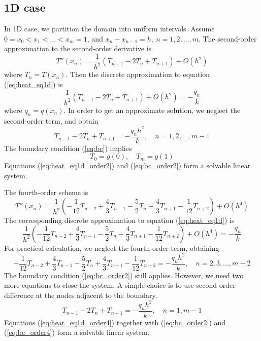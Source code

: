 \documentclass{article}
\begin{document}
\subsection{1D case}
In 1D case, we partition the domain into uniform intervals. Assume $0 = x_0 < x_1 < ... < x_m = 1$, and $x_n - x_{n-1} = h,\  n = 1, 2, ..., m$.
The second-order approximation to the second-order derivative is
    $$T''(x_n) = \frac{1}{h^2}\left(T_{n-1} - 2 T_n + T_{n+1}\right) + O(h^2)$$
where $T_n = T(x_n)$.
Then the discrete approximation to equation (\ref{eq:heat_eq1d}) is
    $$\frac{1}{h^2}\left(T_{n-1} - 2 T_n + T_{n+1}\right) + O(h^2) = -\frac{q_n}{k}$$
where $q_n = q(x_n)$. In order to get an approximate solution, we neglect the second-order term, and obtain
\begin{equation} \label{eq:heat_eq1d_order2}
    T_{n-1} - 2 T_n + T_{n+1} = -\frac{q_n h^2}{k}, \quad n = 1, 2, ..., m-1
\end{equation}
The boundary condition (\ref{eq:bc}) implies
\begin{equation} \label{eq:bc_order2}
    T_0 = g(0), \quad T_m = g(1)
\end{equation}
Equations (\ref{eq:heat_eq1d_order2}) and (\ref{eq:bc_order2}) form a solvable linear system.

The fourth-order scheme is
    $$T''(x_n) = \frac{1}{h^2}\left( -\frac{1}{12}T_{n-2} + \frac{4}{3}T_{n-1} - \frac{5}{2}T_n + \frac{4}{3}T_{n+1}
    - \frac{1}{12}T_{n+2} \right) + O(h^4)$$
The corresponding discrete approximation to equation (\ref{eq:heat_eq1d}) is
    $$ \frac{1}{h^2}\left( -\frac{1}{12}T_{n-2} + \frac{4}{3}T_{n-1} - \frac{5}{2}T_n + \frac{4}{3}T_{n+1}
    - \frac{1}{12}T_{n+2} \right) + O(h^4) = -\frac{q_n}{k} $$
For practical calculation, we neglect the fourth-order term, obtaining
\begin{equation} \label{eq:heat_eq1d_order4}
     -\frac{1}{12}T_{n-2} + \frac{4}{3}T_{n-1} - \frac{5}{2}T_n + \frac{4}{3}T_{n+1}
    - \frac{1}{12}T_{n+2}  = -\frac{q_n h^2}{k}, \quad n = 2, 3, ..., m-2
\end{equation}
The boundary condition (\ref{eq:bc_order2}) still applies. However, we need two more equations to close the system.
A simple choice is to use second-order difference at the nodes adjacent to the boundary.
\begin{equation} \label{eq:bc_order4}
    T_{n-1} - 2 T_n + T_{n+1} = -\frac{q_n h^2}{k}, \quad n = 1, m-1
\end{equation}
Equations (\ref{eq:heat_eq1d_order4}) together with (\ref{eq:bc_order2}) and (\ref{eq:bc_order4}) form a solvable linear system.
\end{document}
